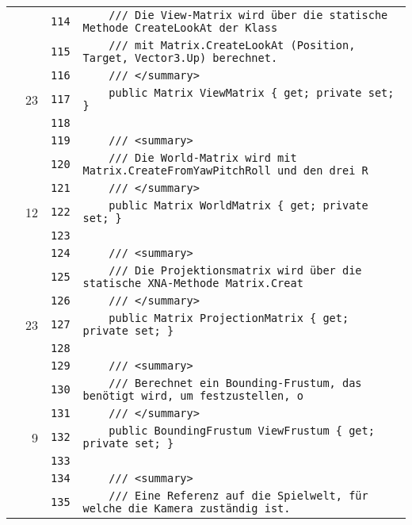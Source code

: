 \documentclass[a4paper,10pt]{article}
\begin{document}
\begin{longtable}[l]{lrrl}
\cellcolor{gray} &  & \verb~114~ & \verb~    /// Die View-Matrix wird über die statische Methode CreateLookAt der Klass~\\
\cellcolor{gray} &  & \verb~115~ & \verb~    /// mit Matrix.CreateLookAt (Position, Target, Vector3.Up) berechnet.~\\
\cellcolor{gray} &  & \verb~116~ & \verb~    /// </summary>~\\
\cellcolor{green} & 23 & \verb~117~ & \verb~    public Matrix ViewMatrix { get; private set; }~\\
\cellcolor{gray} &  & \verb~118~ & \verb~~\\
\cellcolor{gray} &  & \verb~119~ & \verb~    /// <summary>~\\
\cellcolor{gray} &  & \verb~120~ & \verb~    /// Die World-Matrix wird mit Matrix.CreateFromYawPitchRoll und den drei R~\\
\cellcolor{gray} &  & \verb~121~ & \verb~    /// </summary>~\\
\cellcolor{green} & 12 & \verb~122~ & \verb~    public Matrix WorldMatrix { get; private set; }~\\
\cellcolor{gray} &  & \verb~123~ & \verb~~\\
\cellcolor{gray} &  & \verb~124~ & \verb~    /// <summary>~\\
\cellcolor{gray} &  & \verb~125~ & \verb~    /// Die Projektionsmatrix wird über die statische XNA-Methode Matrix.Creat~\\
\cellcolor{gray} &  & \verb~126~ & \verb~    /// </summary>~\\
\cellcolor{green} & 23 & \verb~127~ & \verb~    public Matrix ProjectionMatrix { get; private set; }~\\
\cellcolor{gray} &  & \verb~128~ & \verb~~\\
\cellcolor{gray} &  & \verb~129~ & \verb~    /// <summary>~\\
\cellcolor{gray} &  & \verb~130~ & \verb~    /// Berechnet ein Bounding-Frustum, das benötigt wird, um festzustellen, o~\\
\cellcolor{gray} &  & \verb~131~ & \verb~    /// </summary>~\\
\cellcolor{green} & 9 & \verb~132~ & \verb~    public BoundingFrustum ViewFrustum { get; private set; }~\\
\cellcolor{gray} &  & \verb~133~ & \verb~~\\
\cellcolor{gray} &  & \verb~134~ & \verb~    /// <summary>~\\
\cellcolor{gray} &  & \verb~135~ & \verb~    /// Eine Referenz auf die Spielwelt, für welche die Kamera zuständig ist.~\\

\end{longtable}
\end{document}
